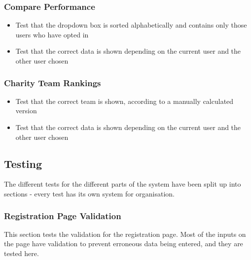 \documentclass{article}[12pt,a4paper]
\begin{document}
\subsubsection{Compare Performance}
\begin{itemize}
  \item Test that the dropdown box is sorted alphabetically and contains only those users who have opted in
  \item Test that the correct data is shown depending on the current user and the other user chosen
\end{itemize}

\subsubsection{Charity Team Rankings}
\begin{itemize}
  \item Test that the correct team is shown, according to a manually calculated version
  \item Test that the correct data is shown depending on the current user and the other user chosen
\end{itemize}

\subsection{Testing}
The different tests for the different parts of the system have been split up into sections - every test has its own system for organisation.

\subsubsection{Registration Page Validation}
This section tests the validation for the registration page. Most of the inputs on the page have validation to prevent erroneous data being entered, and they are tested here.
\end{document}
